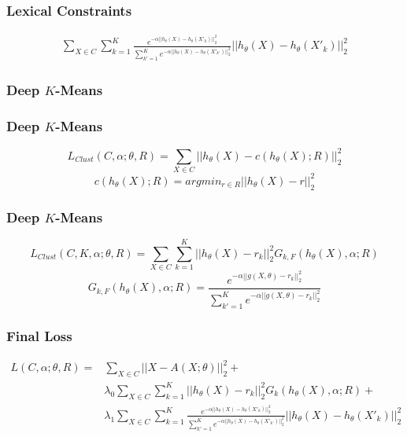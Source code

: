 \documentclass{beamer}
\begin{document}
\begin{frame}
\frametitle{Lexical Constraints}
\begin{equation*}
\begin{array}{l}
  \sum\limits_{X \in C} \sum\limits_{k = 1}^K \frac{e^{-\alpha|| h_\theta(X) - 
h_\theta(X'_k)||_2^2}}{\sum\limits_{k' = 1}^K e^{-\alpha|| h_\theta(X) - 
h_\theta(X'_{k'})||_2^2}}|| h_\theta(X) - h_\theta(X'_{k})||_2^2
\end{array}
\end{equation*}
\end{frame}

\begin{frame}
  \frametitle{Deep $K$-Means }
\end{frame}

\begin{frame}
  \frametitle{Deep $K$-Means }
\begin{equation*}
  L_{Clust}(C,\alpha;\theta,R) = \sum_{X \in C} ||h_\theta(X)-c(h_\theta(X); R)||_2^2
\end{equation*}
\begin{equation*}
  c(h_\theta(X); R) = argmin_{r \in R}||h_\theta(X) - r||_2^2
\end{equation*}
\end{frame}

\begin{frame}
  \frametitle{Deep $K$-Means }
\begin{equation*}
L_{Clust}(C, K, \alpha; \theta, R) = \sum_{X \in C} \sum_{k=1}^K ||h_{\theta}(X) - r_k||_2^2 G_{k, F}(h_{\theta}(X), \alpha; R)
\end{equation*}
\begin{equation*}
G_{k, F}(h_{\theta}(X), \alpha; R) = \frac{e^{-\alpha ||g(X, \theta) - r_k||_2^2}}
{\sum_{k' = 1}^K e^{-\alpha ||g(X, \theta) - r_k||_2^2}}
\end{equation*}
\end{frame}

\begin{frame}
  \frametitle{Final Loss}
  \begin{equation*}
    \begin{array}{ll}
      L(C ,\alpha;\theta,R) = & \sum\limits_{X \in C} ||X - A(X;\theta)||_2^2 + 
      \\ & \lambda_0 \sum\limits_{X \in C}\sum\limits_{k=1}^K||h_\theta(X) - r_k ||_2^2 G_{k}(h_\theta(X), \alpha; R) + 
      \\ & \lambda_1\sum\limits_{X \in C} \sum\limits_{k = 1}^K \frac{e^{-\alpha|| h_\theta(X) - 
          h_\theta(X'_k)||_2^2}}{\sum\limits_{k' = 1}^K e^{-\alpha|| h_\theta(X) - 
          h_\theta(X'_{k'})||_2^2}}|| h_\theta(X) - h_\theta(X'_{k})||_2^2
    \end{array}
  \end{equation*}
\end{frame}
\end{document}
